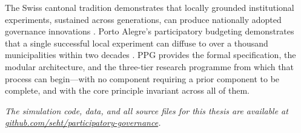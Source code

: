 \documentclass[12pt,a4paper,oneside]{report}
\begin{document}
The Swiss cantonal tradition demonstrates that locally grounded institutional experiments, sustained across generations, can produce nationally adopted governance innovations \citep{linder2010swiss}. Porto Alegre's participatory budgeting demonstrates that a single successful local experiment can diffuse to over a thousand municipalities within two decades \citep{fung2006varieties}. PPG provides the formal specification, the modular architecture, and the three-tier research programme from which that process can begin---with no component requiring a prior component to be complete, and with the core principle invariant across all of them.

\vspace{1em}
\noindent\textit{The simulation code, data, and all source files for this thesis are available at \href{https://github.com/seht/participatory-governance}{github.com/seht/participatory-governance}.}



\end{document}
